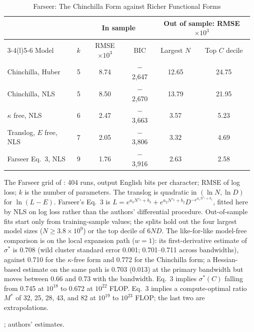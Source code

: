 \begin{table}[tp]
\centering
\caption{Farseer: The Chinchilla Form against Richer Functional Forms}
\label{tab:app-farseer}
\footnotesize
\setlength{\tabcolsep}{3pt}
\begin{tabular}{@{}lccccc@{}}
\toprule
 & & \multicolumn{2}{c}{In sample} & \multicolumn{2}{c}{Out of sample: RMSE $\times10^3$} \\
\cmidrule(lr){3-4}\cmidrule(l){5-6}
Model & $k$ & RMSE $\times10^3$ & BIC & Largest $N$ & Top $C$ decile \\
\midrule
Chinchilla, Huber & 5 & 8.74 & $-$2,647 & 12.65 & 24.75 \\
Chinchilla, NLS & 5 & 8.50 & $-$2,670 & 13.79 & 21.95 \\
$\kappa$ free, NLS & 6 & 2.47 & $-$3,663 & 3.57 & 5.23 \\
Translog, $E$ free, NLS & 7 & 2.05 & $-$3,806 & 3.32 & 4.69 \\
Farseer Eq.~3, NLS & 9 & 1.76 & $-$3,916 & 2.63 & 2.58 \\
\bottomrule
\end{tabular}
\par\smallskip
\begin{tablenotes}The Farseer grid of \citet{li2025predictableb}: 404 runs, output English bits per character; RMSE of
log loss; $k$ is the number of parameters. The translog is quadratic in $(\ln N,\ln D)$ for $\ln(L-E)$. Farseer's Eq.~3 is
$L=e^{a_3N^{\gamma_3}+b_3}+e^{a_2N^{\gamma_2}+b_2}D^{-e^{a_1N^{\gamma_1}+b_1}}$, fitted here by NLS on log loss
rather than the authors' differential procedure. Out-of-sample fits start only from training-sample values; the
splits hold out the four largest model sizes ($N\geq3.8\times10^9$) or the top decile of $6ND$. The like-for-like model-free comparison is on the local expansion path ($w=1$): its first-derivative estimate of
$\sigma^*$ is 0.708 (wild cluster standard error 0.001; 0.701--0.711 across bandwidths), against 0.710 for the
$\kappa$-free form and 0.772 for the Chinchilla form; a Hessian-based estimate on the same path is 0.703 (0.013) at the
primary bandwidth but moves between 0.66 and 0.73 with the bandwidth. Eq.~3 implies $\sigma^*(C)$ falling from 0.745 at
$10^{18}$ to 0.672 at $10^{22}$ FLOP. Eq.~3 implies a compute-optimal ratio $M^*$ of 32, 25, 28, 43, and 82 at
$10^{19}$ to $10^{23}$ FLOP; the last two are extrapolations.\end{tablenotes}
\begin{tablenotes}[Source]\citet{li2025predictableb}; authors' estimates.\end{tablenotes}
\end{table}
